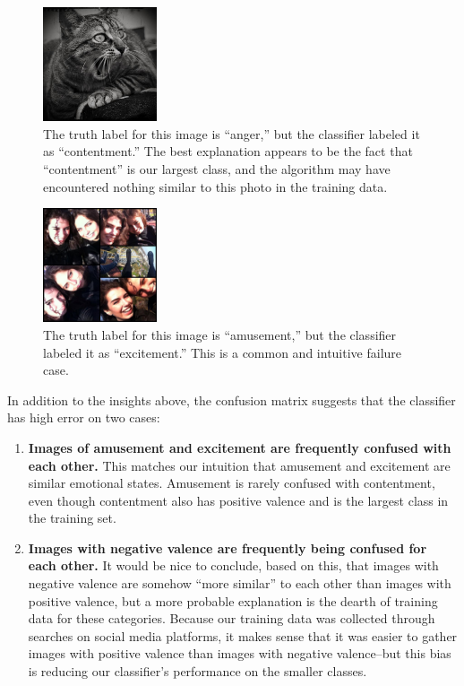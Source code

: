 \documentclass[10pt,twocolumn,letterpaper]{article}
\begin{document}
\begin{figure}
\centering
\includegraphics[width=0.3\textwidth]{anger-157.png}
\caption{The truth label for this image is ``anger,'' but the classifier labeled it as ``contentment.'' The best explanation appears to be the fact that ``contentment'' is our largest class, and the algorithm may have encountered nothing similar to this photo in the training data.}
\end{figure}

\begin{figure}
\centering
\includegraphics[width=0.3\textwidth]{amusement-12.png}
\caption{The truth label for this image is ``amusement,'' but the classifier labeled it as ``excitement.'' This is a common and intuitive failure case.}
\end{figure}

In addition to the insights above, the confusion matrix suggests that the classifier has high error on two cases:

\begin{enumerate}
  \item \textbf{Images of amusement and excitement are frequently confused with each other.} This matches our intuition that amusement and excitement are similar emotional states. Amusement is rarely confused with contentment, even though contentment also has positive valence and is the largest class in the training set.
  \item \textbf{Images with negative valence are frequently being confused for each other.} It would be nice to conclude, based on this, that images with negative valence are somehow ``more similar'' to each other than images with positive valence, but a more probable explanation is the dearth of training data for these categories. Because our training data was collected through searches on social media platforms, it makes sense that it was easier to gather images with positive valence than images with negative valence--but this bias is reducing our classifier's performance on the smaller classes.
\end{enumerate}
\end{document}
